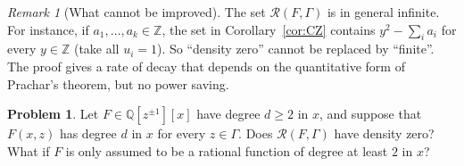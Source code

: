 \documentclass[11pt]{amsart}
\theoremstyle{definition}
\newtheorem{problem}[lemma]{Problem}
\theoremstyle{remark}
\newtheorem{remark}[lemma]{Remark}
\newcommand{\Z}{\mathbb{Z}}
\newcommand{\Q}{\mathbb{Q}}
\newcommand{\R}{\mathcal{R}}
\begin{document}
\begin{remark}[What cannot be improved]
The set $\R(F,\Gamma)$ is in general infinite.
For instance, if $a_1,\dots,a_k\in\Z$, the set in Corollary~\ref{cor:CZ} contains $y^2-\sum_ia_i$ for every $y\in\Z$ (take all $u_i=1$).
So ``density zero'' cannot be replaced by ``finite''.
The proof gives a rate of decay that depends on the quantitative form of Prachar's theorem, but no power saving.
\end{remark}

\begin{problem}
Let $F\in\Q[z^{\pm1}][x]$ have degree $d\ge2$ in $x$, and suppose that $F(x,z)$ has degree $d$ in $x$ for every $z\in\Gamma$.
Does $\R(F,\Gamma)$ have density zero?
What if $F$ is only assumed to be a rational function of degree at least $2$ in $x$?
\end{problem}
\end{document}
